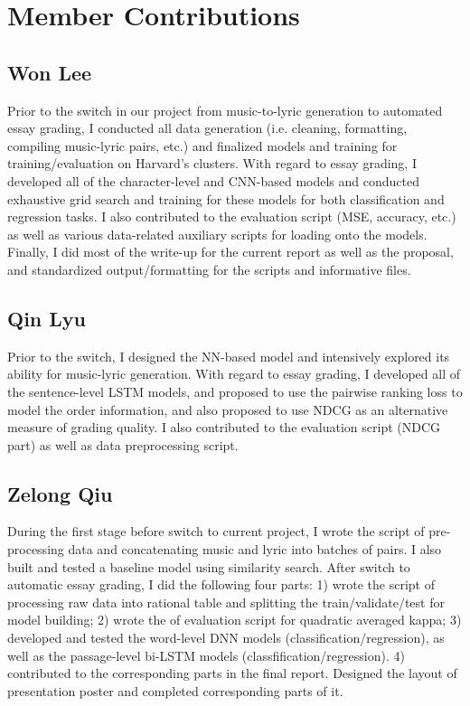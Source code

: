 \documentclass[10pt,psamsfonts]{amsart}
\theoremstyle{definition}
\theoremstyle{remark}
\numberwithin{equation}{section}
\begin{document}
\section*{Member Contributions}

\subsection*{Won Lee}

Prior to the switch in our project from music-to-lyric generation to automated essay grading, I conducted all data generation (i.e. cleaning, formatting, compiling music-lyric pairs, etc.) and finalized models and training for training/evaluation on Harvard's clusters. With regard to essay grading, I developed all of the character-level and CNN-based models and conducted exhaustive grid search and training for these models for both classification and regression tasks. I also contributed to the evaluation script (MSE, accuracy, etc.) as well as various data-related auxiliary scripts for loading onto the models. Finally, I did most of the write-up for the current report as well as the proposal, and standardized output/formatting for the scripts and informative files.

\subsection*{Qin Lyu}

Prior to the switch, I designed the NN-based model and intensively explored its ability for music-lyric generation. With regard to essay grading, I developed all of the sentence-level LSTM models, and proposed to use the pairwise ranking loss to model the order information, and also proposed to use NDCG as an alternative measure of grading quality. I also contributed to the evaluation script (NDCG part) as well as data preprocessing script.

\subsection*{Zelong Qiu}
During the first stage before switch to current project, I wrote the script of pre-processing data and concatenating music and lyric into batches of pairs. I also built and tested a baseline model using similarity search. After switch to automatic essay grading, I did the following four parts: 1) wrote the script of processing raw data into rational table and splitting the train/validate/test for model building; 2) wrote the of evaluation script for quadratic averaged kappa; 3) developed and tested the word-level DNN models (classification/regression), as well as the passage-level bi-LSTM models (classfification/regression). 4) contributed to the corresponding parts in the final report. Designed the layout of presentation poster and completed corresponding parts of it.
\end{document}
